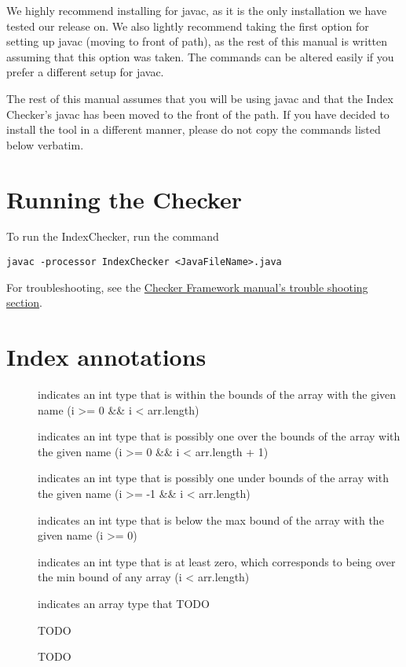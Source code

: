 We highly recommend installing for javac, as it is the only installation we have tested our release on. We also lightly recommend taking the first option for setting up javac (moving to front of path), as the rest of this manual is written assuming that this option was taken. The commands can be altered easily if you prefer a different setup for javac.

The rest of this manual assumes that you will be using javac and that the Index Checker's javac has been moved to the front of the path. If you have decided to install the tool in a different manner, please do not copy the commands listed below verbatim.

\section{Running the Checker\label{index-running}}

To run the IndexChecker, run the command

\begin{Verbatim}
javac -processor IndexChecker <JavaFileName>.java
\end{Verbatim}

For troubleshooting, see the \href{http://types.cs.washington.edu/checker-framework/current/checker-framework-manual.html#troubleshooting}{Checker Framework manual's trouble shooting section}.

\section{Index annotations\label{index-annotations}}

\begin{description}
\item[]
	indicates an int type that is within the bounds of the array with the given name (i >= 0 \&\& i < arr.length)
\item[]
	indicates an int type that is possibly one over the bounds of the array with the given name (i >= 0 \&\& i < arr.length + 1)
\item[]
	indicates an int type that is possibly one under bounds of the array with the given name (i >= -1 \&\& i < arr.length)
\item[]
	indicates an int type that is below the max bound of the array with the given name (i >= 0)
\item[]
	indicates an int type that is at least zero, which corresponds to being over the min bound of any array (i < arr.length)
\item[]
	indicates an array type that TODO
\end{description}

\begin{figure}
\caption{TODO}
\label{fig-index-figure}
\end{figure}

\begin{figure}
\caption{TODO}
\label{fig-index-heirarchy}
\end{figure}